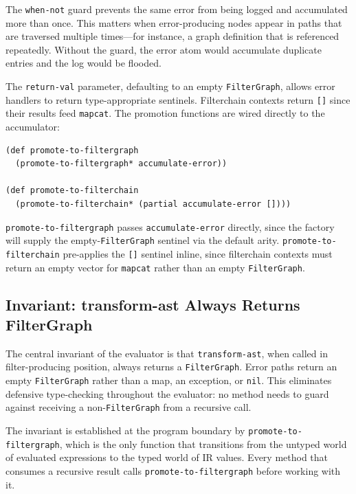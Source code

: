 \documentclass[english,submission]{programming}
\begin{document}
The \texttt{when-not} guard prevents the same error from being logged and accumulated more than once. This matters when error-producing nodes appear in paths that are traversed multiple times---for instance, a graph definition that is referenced repeatedly. Without the guard, the error atom would accumulate duplicate entries and the log would be flooded.

The \texttt{return-val} parameter, defaulting to an empty \texttt{FilterGraph}, allows error handlers to return type-appropriate sentinels. Filterchain contexts return \texttt{[]} since their results feed \texttt{mapcat}. The promotion functions are wired directly to the accumulator:

\begin{lstlisting}[caption={Direct wiring of promotion functions to error handler}]
(def promote-to-filtergraph
  (promote-to-filtergraph* accumulate-error))

(def promote-to-filterchain
  (promote-to-filterchain* (partial accumulate-error [])))
\end{lstlisting}

\texttt{promote-to-filtergraph} passes \texttt{accumulate-error} directly, since the factory will supply the empty-\texttt{FilterGraph} sentinel via the default arity. \texttt{promote-to-filterchain} pre-applies the \texttt{[]} sentinel inline, since filterchain contexts must return an empty vector for \texttt{mapcat} rather than an empty \texttt{FilterGraph}.

\subsection{Invariant: transform-ast Always Returns FilterGraph}

The central invariant of the evaluator is that \texttt{transform-ast}, when called in filter-producing position, always returns a \texttt{FilterGraph}. Error paths return an empty \texttt{FilterGraph} rather than a map, an exception, or \texttt{nil}. This eliminates defensive type-checking throughout the evaluator: no method needs to guard against receiving a non-\texttt{FilterGraph} from a recursive call.

The invariant is established at the program boundary by \texttt{promote-to-filtergraph}, which is the only function that transitions from the untyped world of evaluated expressions to the typed world of IR values. Every method that consumes a recursive result calls \texttt{promote-to-filtergraph} before working with it.
\end{document}

